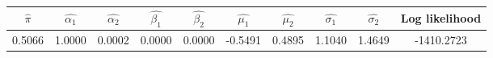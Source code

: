 \begin{tabular}{c |c |c |c |c |c |c |c |c |c}
$\hat{\pi}$ & $\hat{\alpha_1}$ & $\hat{\alpha_2}$ & $\hat{\beta_1}$ & $\hat{\beta_2}$ & $\hat{\mu_1}$ & $\hat{\mu_2}$ & $\hat{\sigma_1}$ & $\hat{\sigma_2}$ & Log likelihood \\
    \hline
  0.5066 & 1.0000 & 0.0002 & 0.0000 & 0.0000 & -0.5491 & 0.4895 & 1.1040 & 1.4649 & -1410.2723 \\
\end{tabular}
